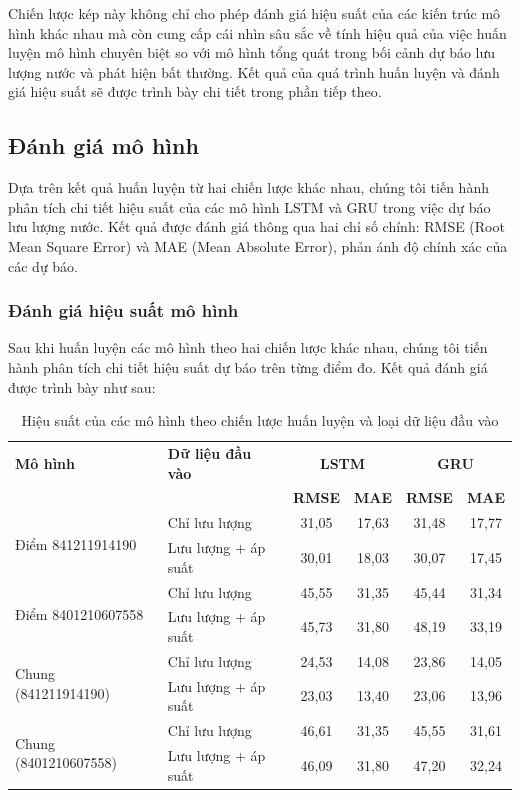 Chiến lược kép này không chỉ cho phép đánh giá hiệu suất của các kiến trúc mô hình khác nhau mà còn cung cấp cái nhìn sâu sắc về tính hiệu quả của việc huấn luyện mô hình chuyên biệt so với mô hình tổng quát trong bối cảnh dự báo lưu lượng nước và phát hiện bất thường. Kết quả của quá trình huấn luyện và đánh giá hiệu suất sẽ được trình bày chi tiết trong phần tiếp theo.

\subsection{Đánh giá mô hình}

Dựa trên kết quả huấn luyện từ hai chiến lược khác nhau, chúng tôi tiến hành phân tích chi tiết hiệu suất của các mô hình LSTM và GRU trong việc dự báo lưu lượng nước. Kết quả được đánh giá thông qua hai chỉ số chính: RMSE (Root Mean Square Error) và MAE (Mean Absolute Error), phản ánh độ chính xác của các dự báo.

\subsubsection{Đánh giá hiệu suất mô hình}

Sau khi huấn luyện các mô hình theo hai chiến lược khác nhau, chúng tôi tiến hành phân tích chi tiết hiệu suất dự báo trên từng điểm đo. Kết quả đánh giá được trình bày như sau:

\begin{table}[htbp]
    \centering
    \begin{tabular}{|p{4.5cm}|p{3.5cm}|c|c|c|c|}
        \hline
        \textbf{Mô hình} & \textbf{Dữ liệu đầu vào} & \multicolumn{2}{c|}{\textbf{LSTM}} & \multicolumn{2}{c|}{\textbf{GRU}} \\
        \cline{3-6}
        & & \textbf{RMSE} & \textbf{MAE} & \textbf{RMSE} & \textbf{MAE} \\
        \hline
        \multirow{2}{*}{Điểm 841211914190} & Chỉ lưu lượng & 31,05 & 17,63 & 31,48 & 17,77 \\
        \cline{2-6}
        & Lưu lượng + áp suất & 30,01 & 18,03 & 30,07 & 17,45 \\
        \hline
        \multirow{2}{*}{Điểm 8401210607558} & Chỉ lưu lượng & 45,55 & 31,35 & 45,44 & 31,34 \\
        \cline{2-6}
        & Lưu lượng + áp suất & 45,73 & 31,80 & 48,19 & 33,19 \\
        \hline
        \multirow{2}{*}{Chung (841211914190)} & Chỉ lưu lượng & 24,53 & 14,08 & 23,86 & 14,05 \\
        \cline{2-6}
        & Lưu lượng + áp suất & 23,03 & 13,40 & 23,06 & 13,96 \\
        \hline
        \multirow{2}{*}{Chung (8401210607558)} & Chỉ lưu lượng & 46,61 & 31,35 & 45,55 & 31,61 \\
        \cline{2-6}
        & Lưu lượng + áp suất & 46,09 & 31,80 & 47,20 & 32,24 \\
        \hline
    \end{tabular}
    \caption{Hiệu suất của các mô hình theo chiến lược huấn luyện và loại dữ liệu đầu vào}
    \label{tab:model_performance_detailed}
\end{table}

